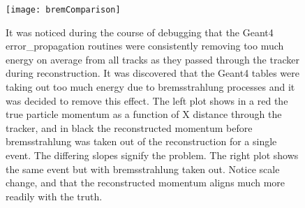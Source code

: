 \begin{figure}[]
\caption{It was noticed during the course of debugging that the Geant4 error\_propagation routines were consistently removing too much energy on average from all tracks as they passed through the tracker during reconstruction. It was discovered that the Geant4 tables were taking out too much energy due to bremsstrahlung processes and it was decided to remove this effect. The left plot shows in a red the true particle momentum as a function of X distance through the tracker, and in black the reconstructed momentum before bremsstrahlung was taken out of the reconstruction for a single event. The differing slopes signify the problem. The right plot shows the same event but with bremsstrahlung taken out. Notice scale change, and that the reconstructed momentum aligns much more readily with the truth.}
\centering
\texttt{[image: bremComparison]}
\label{fig:bremComparison}
\end{figure}
